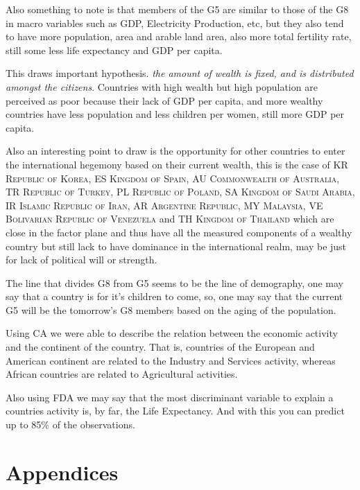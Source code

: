 \documentclass[a4paper,10pt,twocolumn]{article}
\begin{document}
Also something to note is that members of the \textsc{G5} are similar to those of the \textsc{G8} in macro variables such as GDP, Electricity Production, etc, but they also tend to have more population, area and arable land area, also more total fertility rate, still some less life expectancy and GDP per capita. 

This draws important hypothesis. \emph{the amount of wealth is fixed, and is distributed amongst the citizens}. Countries with high wealth but high population are perceived as poor because their lack of GDP per capita, and more wealthy countries have less population and less children per women, still more GDP per capita.

Also an interesting point to draw is the opportunity for other countries to enter the international hegemony based on their current wealth, this is the case of \textsc{KR	Republic of Korea}, \textsc{ES	Kingdom of Spain}, \textsc{AU	Commonwealth of Australia}, \textsc{TR	Republic of Turkey}, \textsc{PL	Republic of Poland}, \textsc{SA	Kingdom of Saudi Arabia}, \textsc{IR	Islamic Republic of Iran}, \textsc{AR	Argentine Republic}, \textsc{MY	Malaysia}, \textsc{VE	Bolivarian Republic of Venezuela} and \textsc{TH	Kingdom of Thailand} which are close in the factor plane and thus have all the measured components of a wealthy country but still lack to have dominance in the international realm, may be just for lack of political will or strength.

The line that divides \textsc{G8} from \textsc{G5} seems to be the line of demography, one may say that a country is for it's children to come, so, one may say that the current \textsc{G5} will be the tomorrow's \textsc{G8} members based on the aging of the population. 

Using CA we were able to describe the relation between the economic activity and the continent of the country. That is, countries of the European and American continent are related to the Industry and Services activity, whereas African countries are related to Agricultural activities. 

Also using FDA we may say that the most discriminant variable to explain a countries activity is, by far, the Life Expectancy. And with this you can predict up to 85\% of the observations. 




\appendix
\onecolumn
\section{Appendices}
\end{document}
